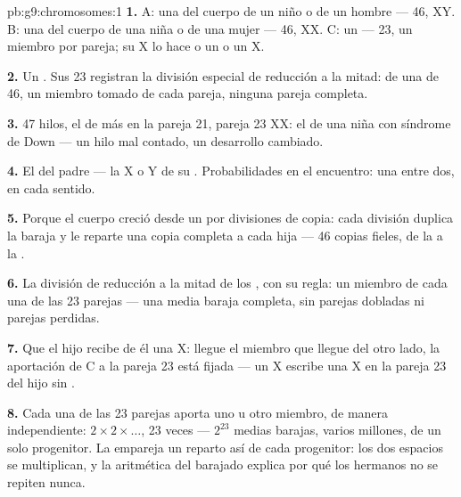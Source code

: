 \begin{solution}{pb:g9:chromosomes:1}
\textbf{1.} A: una  del cuerpo de un niño o de un hombre --- 46,
XY. B: una  del cuerpo de una niña o de una mujer --- 46, XX. C:
un  --- 23, un miembro por pareja; su X lo hace o un  o un
 X.

\textbf{2.} Un . Sus 23 registran la división especial de
reducción a la mitad: de una  de 46, un miembro tomado de cada
pareja, ninguna pareja completa.

\textbf{3.} 47 hilos, el de más en la pareja 21, pareja 23 XX: el
 de una niña con síndrome de Down --- un hilo mal contado, un
desarrollo cambiado.

\textbf{4.} El del padre --- la X o Y de su .
Probabilidades en el encuentro: una entre dos, en cada sentido.

\textbf{5.} Porque el cuerpo creció desde un  por divisiones de
copia: cada división duplica la baraja y le reparte una copia completa
a cada  hija --- 46 copias fieles, de la  a la .

\textbf{6.} La división de reducción a la mitad de los , con su
regla: un miembro de cada una de las 23 parejas --- una media baraja
completa, sin parejas dobladas ni parejas perdidas.

\textbf{7.} Que el hijo recibe de él una X: llegue el miembro que
llegue del otro lado, la aportación de C a la pareja 23 está fijada ---
un  X escribe una X en la pareja 23 del hijo sin .

\textbf{8.} Cada una de las 23 parejas aporta uno u otro miembro, de
manera independiente: $2 \times 2 \times \dots$, 23 veces --- $2^{23}$
medias barajas, varios millones, de un solo progenitor. La 
empareja un reparto así de cada progenitor: los dos espacios se
multiplican, y la aritmética del barajado explica por qué los hermanos
no se repiten nunca.


\end{solution}
